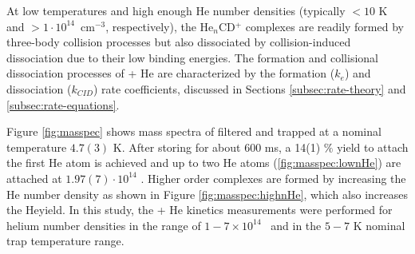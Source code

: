 

At low temperatures and high enough He number densities (typically $< 10$ K and
$> 1\cdot10^{14}$~cm$^{-3}$, respectively), the He$_n$CD$^+$ complexes are
readily formed by three-body collision processes but also dissociated by
collision-induced dissociation due to their low binding energies. The formation
and collisional dissociation processes of \CD + He are characterized by the
formation ($k_{e}$) and dissociation ($k_{CID}$) rate coefficients, discussed
in Sections \ref{subsec:rate-theory} and \ref{subsec:rate-equations}.

Figure \ref{fig:masspec} shows mass spectra of filtered and trapped \CD at
a nominal temperature $4.7(3)$ K. After storing \CD for about 600 ms, a 14(1)
$\%$ yield to attach the first He atom is achieved and up to two He atoms
(\ref{fig:masspec:lownHe}) are attached at $1.97(7) \cdot 10^{14}$ \percc.
Higher order complexes are formed by increasing the He number density as shown
in Figure \ref{fig:masspec:highnHe}, which also increases the He\CD yield. In
this study, the \CD + He kinetics measurements were performed for helium
number densities in the range of $1-7 \times 10^{14}$ \percc\ and in the 
$5 - 7$ K nominal trap temperature range.